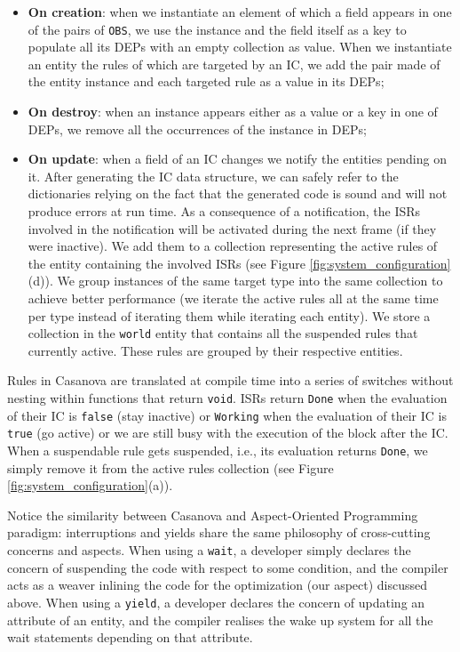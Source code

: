 \begin{itemize}
\item \textbf{On creation}: when we instantiate an element of which a field appears in one of the pairs of \texttt{OBS}, we use the instance and the field itself as a key to populate all its DEPs with an empty collection as value. When we instantiate an entity the rules of which are targeted by an IC, we add the pair made of the entity instance and each targeted rule as a value in its DEPs;
\item \textbf{On destroy}: when an instance appears either as a value or a key in one of DEPs, we remove all the occurrences of the instance in DEPs;
\item \textbf{On update}: when a field of an IC changes we notify the entities pending on it. After generating the IC data structure, we can safely refer to the dictionaries relying on the fact that the generated code is sound and will not produce errors at run time. As a consequence of a notification, the ISRs involved in the notification will be activated during the next frame (if they were inactive). We add them to a collection representing the active rules of the entity containing the involved ISRs (see Figure \ref{fig:system_configuration}(d)). We group instances of the same target type into the same collection to achieve better performance (we iterate the active rules all at the same time per type instead of iterating them while iterating each entity). We store a collection in the \texttt{world} entity that contains all the suspended rules that currently active. These rules are grouped by their respective entities.
\end{itemize}


Rules in Casanova are translated at compile time into a series of switches without nesting within functions that return \texttt{void}. ISRs return \texttt{Done} when the evaluation of their IC is \texttt{false} (stay inactive) or \texttt{Working} when the evaluation of their IC is \texttt{true} (go active) or we are still busy with the execution of the block after the IC. When a suspendable rule gets suspended, i.e., its evaluation returns \texttt{Done}, we simply remove it from the active rules collection (see Figure \ref{fig:system_configuration}(a)).

Notice the similarity between Casanova and Aspect-Oriented Programming paradigm: interruptions and yields share the same philosophy of cross-cutting concerns and aspects. When using a \texttt{wait}, a developer simply declares the concern of suspending the code with respect to some condition, and the compiler acts as a weaver inlining the code for the optimization (our aspect) discussed above. When using a \texttt{yield}, a developer declares the concern of updating an attribute of an entity, and the compiler realises the wake up system for all the wait statements depending on that attribute.

